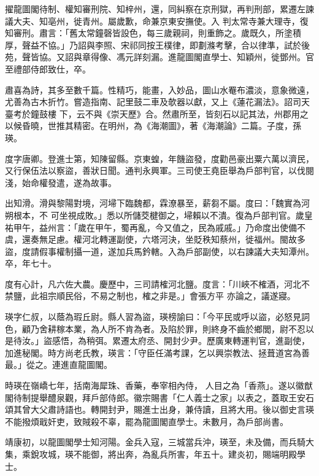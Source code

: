 \begin{pinyinscope}
 擢龍圖閣待制、權知審刑院、知梓州，還，同糾察在京刑獄，再判刑部，累遷左諫議大夫、知亳州，徙青州。屬歲歉，命兼京東安撫使。入
 判太常寺兼大理寺，復知審刑。肅言：「舊太常鐘磬皆設色，每三歲親祠，則重飾之。歲既久，所塗積厚，聲益不協。」乃詔與李照、宋祁同按王樸律，即劃滌考擊，合以律準，試於後苑，聲皆協。又詔與章得像、馮元詳刻漏。進龍圖閣直學士、知穎州，徙鄧州。官至禮部侍郎致仕，卒。



 肅喜為詩，其多至數千篇。性精巧，能畫，入妙品，圖山水罨布濃淡，意象微遠，尤善為古木折竹。嘗造指南、記里鼓二車及欹器以獻，又上《蓮花漏法》。詔司天臺考於鐘鼓樓
 下，云不與《崇天歷》合。然肅所至，皆刻石以記其法，州郡用之以候昏曉，世推其精密。在明州，為《海潮圖》，著《海潮論》二篇。子度，孫瑛。



 度字唐卿。登進士第，知陳留縣。京東蝗，年饑盜發，度勸邑豪出粟六萬以濟民，又行保伍法以察盜，善狀日聞。通判永興軍。三司使王堯臣舉為戶部判官，以伐閱淺，始命權發遣，遂為故事。



 出知滑。滑與黎陽對境，河埽下臨魏都，霖潦暴至，薪芻不屬。度曰：「魏實為河朔根本，不
 可坐視成敗。」悉以所儲茭楗御之，埽賴以不潰。復為戶部判官。歲皇祐甲午，益州言：「歲在甲午，蜀再亂，今又值之，民為戚戚。」乃命度出使備不虞，還奏無足慮。權河北轉運副使，六塔河決，坐貶秩知蔡州，徙福州。閩故多盜，度請假事權制攝一道，遂加兵馬鈐轄。入為戶部副使，以右諫議大夫知潭州。卒，年七十。



 度有心計，凡六佐大農。慶歷中，三司請榷河北鹽。度言：「川峽不榷酒，河北不禁鹽，此祖宗順民俗，不易之制也，榷之非是。」會張方平
 亦論之，議遂寢。



 瑛字仁叔，以蔭為瑕丘尉。縣人習為盜，瑛榜諭曰：「今平民或呼以盜，必怒見詞色，顧乃舍耕稼本業，為人所不肯為者。及陷於罪，則終身不齒於鄉閭，尉不忍以是待汝。」盜感悟，為稍弭。累遷太府丞、開封少尹。歷廣東轉運判官，進副使，加進秘閣。時方尚老氏教，瑛言：「守臣任滿考課，乞以興崇教法、拯葺道宮為善最。」從之。連進直龍圖閣。



 時瑛在嶺嶠七年，括南海犀珠、香藥，奉宰相內侍，
 人目之為「香燕」。遂以徽猷閣待制提舉醴泉觀，拜戶部侍郎。徽宗賜書「仁人義士之家」以表之，蓋取王安石頌其曾大父肅詩語也。轉開封尹，賜進士出身，兼侍讀，且將大用。後以御史言瑛不能撥煩戢奸吏，致賊殺不辜，罷為龍圖閣直學士。未數月，為戶部尚書。



 靖康初，以龍圖閣學士知河陽。金兵入寇，三城當兵沖，瑛至，未及備，而兵騎大集，乘銳攻城，瑛不能御，將出奔，為亂兵所害，年五十。建炎初，賜端明殿學士。




\end{pinyinscope}
